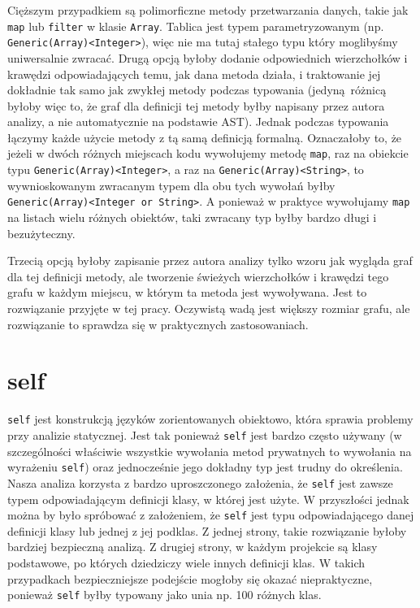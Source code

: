 \documentclass[declaration,shortabstract,mgr]{iithesis}
\begin{document}
Cięższym przypadkiem są polimorficzne metody przetwarzania danych, takie jak \texttt{map} lub \texttt{filter} w klasie \texttt{Array}. Tablica jest typem parametryzowanym (np. \texttt{Generic(Array)<Integer>}), więc nie ma tutaj stałego typu który moglibyśmy uniwersalnie zwracać. Drugą opcją byłoby dodanie odpowiednich wierzchołków i krawędzi odpowiadających temu, jak dana metoda działa, i traktowanie jej dokładnie tak samo jak zwykłej metody podczas typowania (jedyną różnicą byłoby więc to, że graf dla definicji tej metody byłby napisany przez autora analizy, a nie automatycznie na podstawie AST). Jednak podczas typowania łączymy każde użycie metody z tą samą definicją formalną. Oznaczałoby to, że jeżeli w dwóch różnych miejscach kodu wywołujemy metodę \texttt{map}, raz na obiekcie typu \texttt{Generic(Array)<Integer>}, a raz na \texttt{Generic(Array)<String>}, to wywnioskowanym zwracanym typem dla obu tych wywołań byłby \texttt{Generic(Array)<Integer or String>}. A ponieważ w praktyce wywołujamy \texttt{map} na listach wielu różnych obiektów, taki zwracany typ byłby bardzo długi i bezużyteczny.

Trzecią opcją byłoby zapisanie przez autora analizy tylko wzoru jak wygląda graf dla tej definicji metody, ale tworzenie świeżych wierzchołków i krawędzi tego grafu w każdym miejscu, w którym ta metoda jest wywoływana. Jest to rozwiązanie przyjęte w tej pracy. Oczywistą wadą jest większy rozmiar grafu, ale rozwiązanie to sprawdza się w praktycznych zastosowaniach.

\section{self}

\texttt{self} jest konstrukcją języków zorientowanych obiektowo, która sprawia problemy przy analizie statycznej.
Jest tak ponieważ \texttt{self} jest bardzo często używany (w szczególności właściwie wszystkie wywołania metod prywatnych to wywołania na wyrażeniu \texttt{self}) oraz jednocześnie jego dokładny typ jest trudny do określenia. Nasza analiza korzysta z bardzo uproszczonego założenia, że \texttt{self} jest zawsze typem odpowiadającym definicji klasy, w której jest użyte. W przyszłości jednak można by było spróbować z założeniem, że \texttt{self} jest typu odpowiadającego danej definicji klasy lub jednej z jej podklas. Z jednej strony, takie rozwiązanie byłoby bardziej bezpieczną analizą. Z drugiej strony, w każdym projekcie są klasy podstawowe, po których dziedziczy wiele innych definicji klas. W takich przypadkach bezpieczniejsze podejście mogłoby się okazać niepraktyczne, ponieważ \texttt{self} byłby typowany jako unia np. 100 różnych klas.
\end{document}
